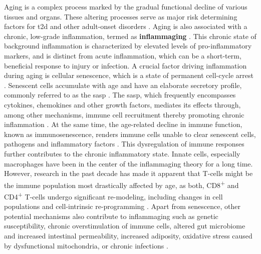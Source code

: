 Aging is a complex process marked by the gradual functional decline of various tissues and organs. These altering processes serve as major risk determining factors for \gls{t2d} and other adult-onset disorders \textbf{\cite{sandovici_ageing_2016,tuduri_pancreatic_2022}}. Aging is also associated with a chronic, low-grade inflammation, termed as \textbf{inflammaging} \textbf{\cite{frasca_aging_2017,franceschi_inflamm-aging_2000}}. This chronic state of background inflammation is characterized by elevated levels of pro-inflammatory markers, and is distinct from acute inflammation, which can be a short-term, beneficial response to injury or infection. A crucial factor driving inflammation during aging is cellular senescence, which is a state of permanent cell-cycle arrest \textbf{\cite{ren_inflammatory_2009}}. Senescent cells accumulate with age and have an elaborate secretory profile, commonly referred to as the \gls{sasp} \textbf{\cite{gorgoulis_cellular_2019}}. The \gls{sasp}, which frequently encompasses cytokines, chemokines and other growth factors, mediates its effects through, among other mechanisms, immune cell recruitment thereby promoting chronic inflammation \textbf{\cite{gorgoulis_cellular_2019}}. At the same time, the age-related decline in immune function, known as immunosenescence, renders immune cells unable to clear senescent cells, pathogens and inflammatory factors \textbf{\cite{sanada_source_2018}}. This dysregulation of immune responses further contributes to the chronic inflammatory state. Innate cells, especially macrophages have been in the center of the inflammaging theory for a long time. However, research in the past decade has made it apparent that T-cells might be the immune population most drastically affected by age, as both, CD8\textsuperscript{+} and CD4\textsuperscript{+} T-cells undergo significant re-modeling, including changes in cell populations and cell-intrinsic re-programming \textbf{\cite{shchukina_t_2023}}. Apart from senescence, other potential mechanisms also contribute to inflammaging such as genetic susceptibility, chronic overstimulation of immune cells, altered gut microbiome and increased intestinal permeability, increased adiposity, oxidative stress caused by dysfunctional mitochondria, or chronic infections \textbf{\cite{frasca_aging_2017,ferrucci_inflammageing_2018,frasca_inflammaging_2016}}.\\

